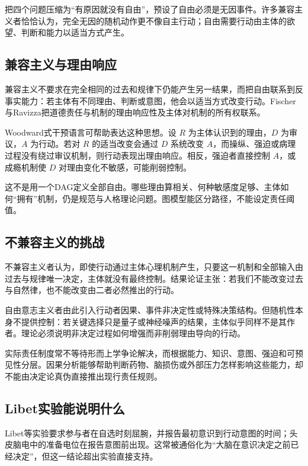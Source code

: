 把四个问题压缩为“有原因就没有自由”，预设了自由必须是无因事件。许多兼容主义者恰恰认为，完全无因的随机动作更不像自主行动；自由需要行动由主体的欲望、判断和能力以适当方式产生。

\subsection{兼容主义与理由响应}

兼容主义不要求在完全相同的过去和规律下仍能产生另一结果，而把自由联系到反事实能力：若主体有不同理由、判断或意图，他会以适当方式改变行动。Fischer与Ravizza把道德责任与机制的理由响应性及主体对机制的所有权联系\parencite{fischerravizza1998}。

Woodward式干预语言可帮助表达这种思想。设 $R$ 为主体认识到的理由，$D$ 为审议，$A$ 为行动。若对 $R$ 的适当改变会通过 $D$ 系统改变 $A$，而操纵、强迫或病理过程没有绕过审议机制，则行动表现出理由响应。相反，强迫者直接控制 $A$，或成瘾机制使 $D$ 对理由变化不敏感，可能削弱控制。

这不是用一个DAG定义全部自由。哪些理由算相关、何种敏感度足够、主体如何“拥有”机制，仍是规范与人格理论问题。图模型能区分路径，不能设定责任阈值。

\subsection{不兼容主义的挑战}

不兼容主义者认为，即使行动通过主体心理机制产生，只要这一机制和全部输入由过去与规律唯一决定，主体就没有最终控制。结果论证主张：若我们不能改变过去与自然律，也不能改变由二者必然推出的行动\parencite{vaninwagen1983}。

自由意志主义者由此引入行动者因果、事件非决定性或特殊决策结构。但随机性本身不提供控制：若关键选择只是量子或神经噪声的结果，主体似乎同样不是其作者。理论必须说明非决定过程如何增强而非削弱理由导向的行动。

实际责任制度常不等待形而上学争论解决，而根据能力、知识、意图、强迫和可预见性分层。因果分析能够帮助判断药物、脑损伤或外部压力怎样影响这些能力，却不能由决定论真伪直接推出现行责任规则。

\subsection{Libet实验能说明什么}

Libet等实验要求参与者在自选时刻屈腕，并报告最初意识到行动意图的时间；头皮脑电中的准备电位在报告意图前出现\parencite{libet1983}。这常被通俗化为“大脑在意识决定之前已经决定”，但这一结论超出实验直接支持。

